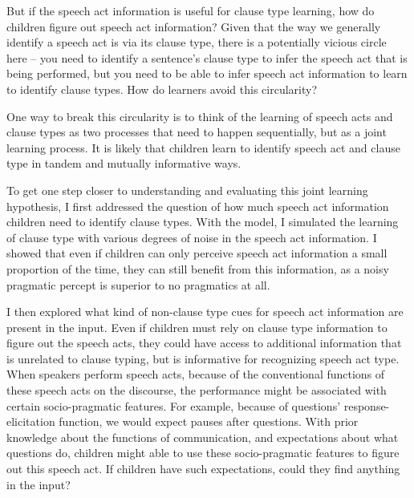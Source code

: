 
But if the speech act information is useful for clause type learning, how do children figure out speech act information? Given that the way we generally identify a speech act is via its clause type, there is a potentially vicious circle here -- you need to identify a sentence's clause type to infer the speech act that is being performed, but you need to be able to infer speech act information to learn to identify clause types. How do learners avoid this circularity?

One way to break this circularity is to  think of the learning of speech acts and clause types as two processes that need to happen sequentially, but as a joint learning process. It is likely that children learn to identify speech act and clause type in tandem and mutually informative ways.

To get one step closer to understanding and evaluating this joint learning hypothesis, I first addressed the question of how much speech act information children need to identify clause types. With the \plearnerabbr{} model, I simulated the learning of clause type with various degrees of noise in the speech act information. I showed that even if children can only perceive speech act information a small proportion of the time, they can still benefit from this information, as a noisy pragmatic percept is superior to no pragmatics at all. 



I then explored what kind of non-clause type cues for speech act information are present in the input. Even if children must rely on clause type information to figure out the speech acts, they could have access to additional information that is unrelated to clause typing, but is informative for recognizing speech act type. When speakers perform speech acts, because of the conventional functions of these speech acts on the discourse, the performance might be associated with certain socio-pragmatic features. For example, because of questions' response-elicitation function, we would expect pauses after questions. With prior knowledge about the functions of communication, and expectations about what questions do, children might able to use these socio-pragmatic features to figure out this speech act. If children have such expectations, could they find anything in the input? 

